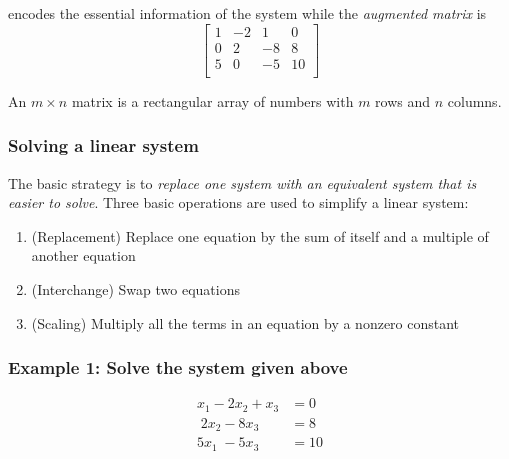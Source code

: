\documentclass[12pt]{article} %
\begin{document}
encodes the essential information of the system while the \emph{augmented matrix} is 
$$\begin{bmatrix}
	1 & -2 & 1 & 0\\ 
	0 & 2 & -8 & 8\\
	5 & 0 & -5 & 10\\
	\end{bmatrix}$$

An $m \times n$ matrix is a rectangular array of numbers with $m$ rows and $n$ columns.

\subsubsection{Solving a linear system}
The basic strategy is to \emph{replace one system with an equivalent system that is easier to solve}. Three basic operations are used to simplify a linear system: 
\begin{enumerate}
\item (Replacement) Replace one equation by the sum of itself and a multiple of another equation 
\item (Interchange) Swap two equations
\item (Scaling) Multiply all the terms in an equation by a nonzero constant
\end{enumerate}

\subsubsection{Example 1: Solve the system given above}
\begin{align*}
	x_1 - 2x_2 + x_3 &= 0\\
	\;	2x_2 - 8x_3 &= 8\\
	5x_1\; 	- 5x_3 &= 10\\
\end{align*}
\end{document}
